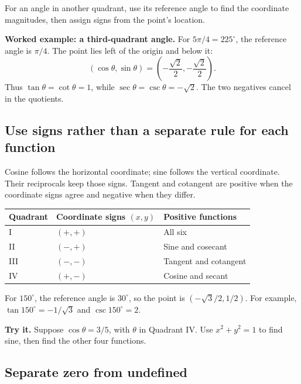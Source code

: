 For an angle in another quadrant, use its reference angle to find the coordinate magnitudes, then assign signs from the point's location.

\textbf{Worked example: a third-quadrant angle.} For \(5\pi/4=225^\circ\), the reference angle is \(\pi/4\). The point lies left of the origin and below it: \[
(\cos\theta,\sin\theta)=
\left(-\frac{\sqrt2}{2},-\frac{\sqrt2}{2}\right).
\] Thus \(\tan\theta=\cot\theta=1\), while \(\sec\theta=\csc\theta=-\sqrt2\). The two negatives cancel in the quotients.

\hypertarget{m2-use-signs-rather-than-a-separate-rule-for-each-function}{%
\subsection{Use signs rather than a separate rule for each function}\label{m2-use-signs-rather-than-a-separate-rule-for-each-function}}

Cosine follows the horizontal coordinate; sine follows the vertical coordinate. Their reciprocals keep those signs. Tangent and cotangent are positive when the coordinate signs agree and negative when they differ.

\begin{longtable}[]{@{}lll@{}}
\toprule\noalign{}
Quadrant & Coordinate signs \((x,y)\) & Positive functions \\
\midrule\noalign{}
\endhead
\bottomrule\noalign{}
\endlastfoot
I & \((+,+)\) & All six \\
II & \((-,+)\) & Sine and cosecant \\
III & \((-,-)\) & Tangent and cotangent \\
IV & \((+,-)\) & Cosine and secant \\
\end{longtable}

For \(150^\circ\), the reference angle is \(30^\circ\), so the point is \((-\sqrt3/2,1/2)\). For example, \(\tan150^\circ=-1/\sqrt3\) and \(\csc150^\circ=2\).

\textbf{Try it.} Suppose \(\cos\theta=3/5\), with \(\theta\) in Quadrant IV. Use \(x^2+y^2=1\) to find sine, then find the other four functions.

\hypertarget{m2-separate-zero-from-undefined}{%
\subsection{Separate zero from undefined}\label{m2-separate-zero-from-undefined}}

